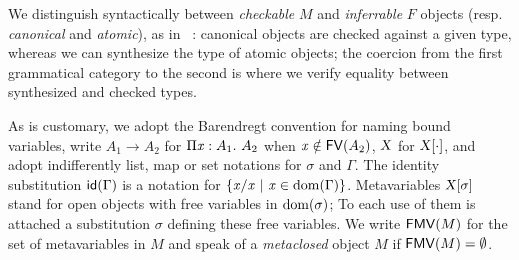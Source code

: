 \documentclass{llncs}
\begin{document}
We distinguish syntactically between \emph{checkable} $M$ and
\emph{inferrable} $F$ objects (resp. \emph{canonical} and
\emph{atomic}), as in \eg\ \cite{pierce2000local}: canonical objects
are checked against a given type, whereas we can synthesize the type
of atomic objects; the coercion from the first grammatical category to
the second is where we verify equality between synthesized and checked
types.

As is customary, we adopt the Barendregt convention for naming bound
variables, write $A_1\to A_2$ for $\Pi{\ensuremath{\text{\textit{x}}}}:{A_1}.\  {A_2}$ when $\text{\textit{x}}\notin
{\text{\textsf{FV}}}({A_2})$, $\text{\textsl{X}}$ for ${\text{\textsl{X}}}[{\cdot}]$, and adopt indifferently
list, map or set notations for $\sigma$ and $\Gamma$. The identity
substitution ${\text{\textsf{id}}}({\Gamma})$ is a notation for $\{{\text{\textit{x}}}/{\text{\textit{x}}}\ |\ \text{\textit{x}} \in\operatorname{dom}{\!(\Gamma)}\}$. Metavariables ${\text{\textsl{X}}}[{\sigma}]$
stand for open objects with free variables in $\operatorname{dom}{\!(\sigma)}$; To each
use of them is attached a substitution $\sigma$ defining these free
variables. We write ${\text{\textsf{FMV}}}({M})$ for the set of metavariables in $M$ and
speak of a \emph{metaclosed} object $M$ if ${\text{\textsf{FMV}}}({M}) = \emptyset$.

\end{document}
